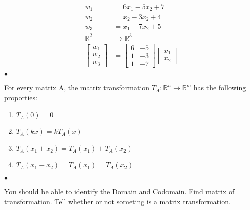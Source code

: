 \begin{example}
	\begin{align*}
		w_1 &=  6x_1 - 5x_2 + 7 \\
		w_2 &=  x_2 - 3x_2 + 4 \\
		w_3 &= x_1 - 7x_2 + 5 \\
		\mathbb{R}^2 &\to \mathbb{R}^3 \\
		\begin{bmatrix} w_1 \\w_2 \\w_3 \end{bmatrix} &=
		\begin{bmatrix} 6 & -5 \\ 1 & -3 \\ 1 & -7 \end{bmatrix}
		\begin{bmatrix} x_1 \\ x_2 \end{bmatrix} \\
	\end{align*}
\smallskip\hfill$\bullet$\end{example}

\begin{theorem}

For every matrix A, the matrix transformation $T_{A}: \mathbb{R}^{n}\to\mathbb{R}^{m}$ has
the following proporties:

\begin{enumerate}
	\item $T_{A}(0) = 0$
	\item $T_{A}(kx) = k T_{A}(x)$
	\item $T_{A}(x_1+x_2) = T_{A}(x_1) + T_{A}(x_2)$
	\item $T_{A}(x_1 - x_2) = T_{A}(x_1) = T_{A}(x_2)$
\end{enumerate}

\smallskip\hfill$\bullet$\end{theorem}

You should be able to identify the Domain and Codomain.
Find matrix of transformation.
Tell whether or not someting is a matrix transformation.


\newpage


